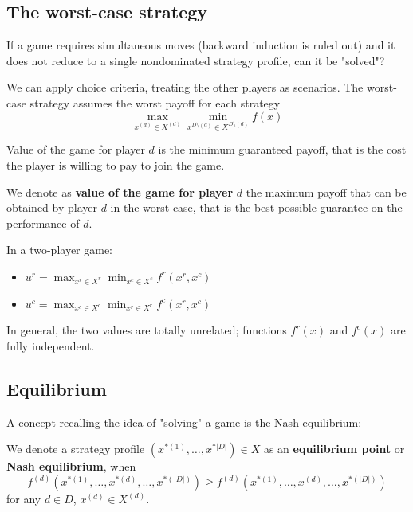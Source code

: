 \subsection{The worst-case strategy}

If a game requires simultaneous moves (backward induction is ruled out) and it does not reduce to a single nondominated strategy profile, can it be "solved"? 

We can apply choice criteria, treating the other players as scenarios. The worst-case strategy assumes the worst payoff for each strategy
$$ \max_{x^{(d)} \in X^{(d)}} \min_{x^{D \setminus (d)} \in X^{D \setminus (d)}} f(x) $$

Value of the game for player $d$ is the minimum guaranteed payoff, that is the cost the player is willing to pay to join the game. \\

\begin{definition}
	We denote as \textbf{value of the game for player} $d$ the maximum payoff that can be obtained by player $d$ in the worst case, that is the best possible guarantee on the performance of $d$.
\end{definition}

In a two-player game: 
\begin{itemize}
	\item $u^r = \max_{x^r \in X^r} \min_{x^c \in X^c} f^r (x^r, x^c)$
	
	\item $u^c = \max_{x^c \in X^c} \min_{x^r \in X^r} f^c (x^r, x^c)$
\end{itemize}
In general, the two values are totally unrelated; functions $f^r(x)$ and $f^c(x)$ are fully independent.

\subsection{Equilibrium}

A concept recalling the idea of "solving" a game is the Nash equilibrium: \\

\begin{definition}
	We denote a strategy profile $\left(x^{\ast (1)}, \dots, x^{\ast |D|}\right) \in X$ as an \textbf{equilibrium point} or \textbf{Nash equilibrium}, when
	$$ f^{(d)} \left(x^{\ast (1)}, \dots, x^{\ast (d)}, \dots, x^{\ast (|D|)}\right) \geq f^{(d)} \left(x^{\ast (1)}, \dots, x^{(d)}, \dots, x^{\ast (|D|)}\right) $$
	for any $d \in D$, $x^{(d)} \in X^{(d)}$.
\end{definition}

